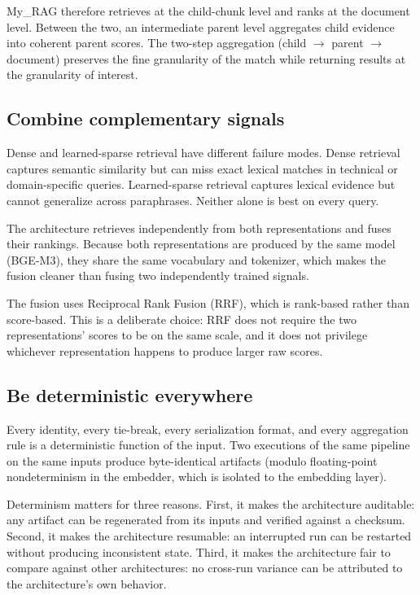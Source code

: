 \documentclass[11pt,a4paper]{article}
\begin{document}
My\_RAG therefore retrieves at the child-chunk level and ranks at
the document level. Between the two, an intermediate parent level
aggregates child evidence into coherent parent scores. The two-step
aggregation (child $\to$ parent $\to$ document) preserves the fine
granularity of the match while returning results at the granularity
of interest.

\subsection{Combine complementary signals}
Dense and learned-sparse retrieval have different failure modes.
Dense retrieval captures semantic similarity but can miss exact
lexical matches in technical or domain-specific queries. Learned-sparse
retrieval captures lexical evidence but cannot generalize across
paraphrases. Neither alone is best on every query.

The architecture retrieves independently from both representations
and fuses their rankings. Because both representations are produced
by the same model (BGE-M3), they share the same vocabulary and
tokenizer, which makes the fusion cleaner than fusing two independently
trained signals.

The fusion uses Reciprocal Rank Fusion (RRF), which is rank-based
rather than score-based. This is a deliberate choice: RRF does not
require the two representations' scores to be on the same scale, and
it does not privilege whichever representation happens to produce
larger raw scores.

\subsection{Be deterministic everywhere}
Every identity, every tie-break, every serialization format, and
every aggregation rule is a deterministic function of the input. Two
executions of the same pipeline on the same inputs produce byte-identical
artifacts (modulo floating-point nondeterminism in the embedder, which
is isolated to the embedding layer).

Determinism matters for three reasons. First, it makes the architecture
auditable: any artifact can be regenerated from its inputs and
verified against a checksum. Second, it makes the architecture
resumable: an interrupted run can be restarted without producing
inconsistent state. Third, it makes the architecture fair to compare
against other architectures: no cross-run variance can be attributed
to the architecture's own behavior.
\end{document}
